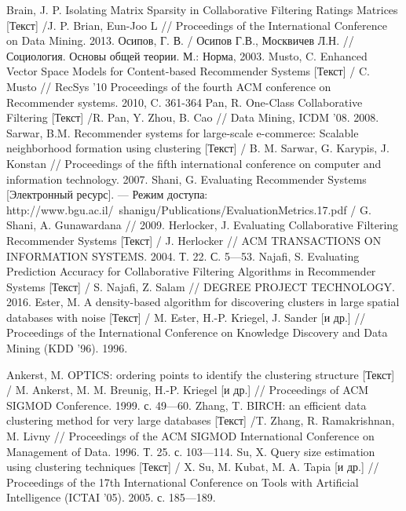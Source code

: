 \begin{thebibliography}{119}
 Brain, J. P. Isolating Matrix Sparsity in Collaborative Filtering Ratings
Matrices [Текст]  /J. P. Brian, Eun-Joo L // Proceedings of the International Conference on Data Mining. 2013.
 Осипов, Г. В. / Осипов Г.В., Москвичев Л.Н. // Социология. Основы общей теории. М.: Норма, 2003.
 Musto, C. Enhanced Vector Space Models for Content-based Recommender
Systems [Текст]  / C. Musto // RecSys '10 Proceedings of the fourth ACM conference on Recommender systems. 2010,
C. 361-364
 Pan, R. One-Class Collaborative Filtering [Текст]  /R. Pan, Y. Zhou, B. Cao // Data Mining, ICDM
’08. 2008.
 Sarwar, B.M. Recommender systems for large-scale e-commerce:
Scalable neighborhood formation using clustering [Текст]   /
B. M. Sarwar, G. Karypis, J. Konstan // Proceedings of
the fifth international conference on computer and information technology. 2007.
 Shani, G. Evaluating Recommender Systems [Электронный ресурс]. --- Режим доступа: http://www.bgu.ac.il/~shanigu/Publications/EvaluationMetrics.17.pdf / G. Shani, A. Gunawardana //
2009.
 Herlocker, J. Evaluating Collaborative Filtering Recommender Systems [Текст]  / J. Herlocker // ACM
TRANSACTIONS ON INFORMATION SYSTEMS. 2004. Т. 22. С. 5---53.
 Najafi, S. Evaluating Prediction Accuracy for Collaborative Filtering
Algorithms in Recommender Systems [Текст]  / S. Najafi, Z. Salam // DEGREE PROJECT TECHNOLOGY.
2016.
 Ester, M. A density-based algorithm for discovering clusters in large spatial databases with
noise [Текст]  / M. Ester, H.-P. Kriegel, J. Sander [и др.] // Proceedings of the International
Conference on Knowledge Discovery and Data Mining (KDD ’96). 1996.

 Ankerst, M. OPTICS: ordering points to identify the clustering structure [Текст]  / M. Ankerst,
M. M. Breunig, H.-P. Kriegel [и др.] // Proceedings of ACM SIGMOD
Conference. 1999. с. 49---60.
 Zhang, T. BIRCH: an efficient data clustering
method for very large databases [Текст]  /T. Zhang, R. Ramakrishnan, M. Livny  // Proceedings of the ACM SIGMOD
International Conference on Management of Data. 1996. Т. 25. с. 103---114.
 Su, X. Query size estimation using clustering techniques [Текст]  / X. Su, M. Kubat, M. A. Tapia
[и др.] // Proceedings of the 17th International Conference on Tools with Artificial
Intelligence (ICTAI ’05). 2005. с. 185---189.





\end{thebibliography}
